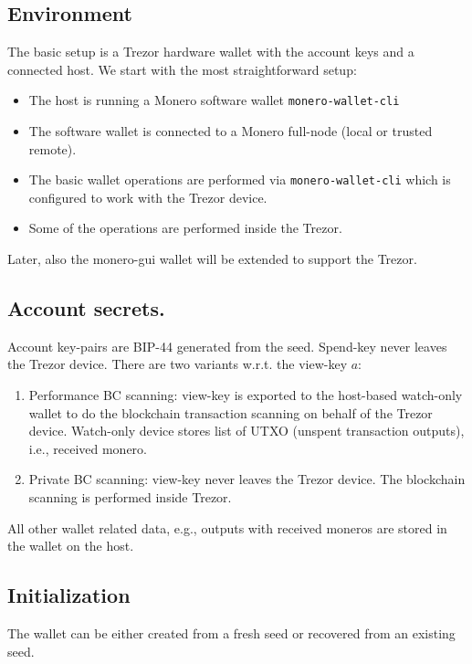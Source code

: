 \documentclass[]{article}
\begin{document}
\subsection{Environment}

The basic setup is a Trezor hardware wallet with the account keys and a connected host.
We start with the most straightforward setup:
\begin{itemize}
	\item The host is running a Monero software wallet \verb|monero-wallet-cli|
	
	\item  The software wallet is connected to a Monero full-node (local or trusted remote).
	
	\item The basic wallet operations are performed via \verb|monero-wallet-cli| which is configured to work with the Trezor device.
	
	\item Some of the operations are performed inside the Trezor. 
\end{itemize}

Later, also the monero-gui wallet will be extended to support the Trezor.

\subsection{Account secrets.}
Account key-pairs are BIP-44 generated from the seed. Spend-key never leaves the Trezor device. There are two variants w.r.t. the view-key $a$:

\begin{enumerate}
	\item Performance BC scanning: view-key is exported to the host-based watch-only wallet to do the blockchain transaction scanning on behalf of the Trezor device. Watch-only device stores list of UTXO (unspent transaction outputs), i.e., received monero.
	\item Private BC scanning: view-key never leaves the Trezor device. The blockchain scanning is performed inside Trezor. 
\end{enumerate}

All other wallet related data, e.g., outputs with received moneros are
stored in the wallet on the host.

\subsection{Initialization} 
The wallet can be either created from a fresh seed or recovered from an existing seed.
\end{document}

